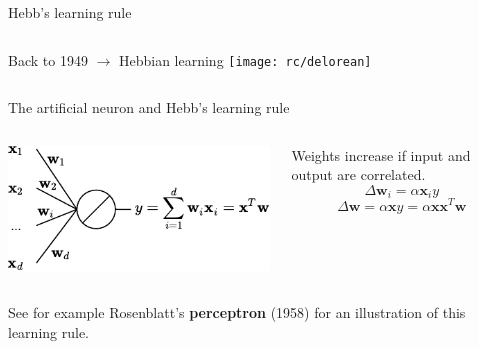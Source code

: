 \documentclass[handout]{beamer}
\begin{document}
  \begin{frame}{Hebb's learning rule}

    \begin{columns}[T,onlytextwidth]
      \vspace{0.5cm}
      Back to 1949 $\rightarrow$ Hebbian learning
      \texttt{[image: rc/delorean]}
    \end{columns}
    \pause

    \begin{block}{The artificial neuron and Hebb's learning rule \cite{hebb-organization-of-behavior-1949}}
      \begin{columns}[T,onlytextwidth]
        \vspace{0.7cm}
        \centering
        \includegraphics[]{rc/artificial-neuron}

        \vspace{0.7cm}
        \centering
        \small{Weights increase if input and output are correlated.}
        \begin{equation*}
          \Delta \mathbf{w}_i = \alpha \mathbf{x}_i y
        \end{equation*}
        \begin{equation*}
          \Delta \mathbf{w} = \alpha \mathbf{x} y = \alpha \mathbf{x} \mathbf{x}^T \mathbf{w}
        \end{equation*}
      \end{columns}
    \end{block}
    
    See for example Rosenblatt's \textbf{perceptron} (1958) \cite{Rosenblatt58theperceptron} for an illustration of this learning rule.

  \end{frame}
\end{document}

